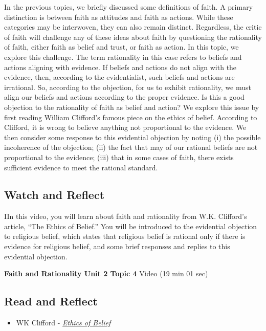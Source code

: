\documentclass[
]{book}
\providecommand{\tightlist}{%
  \setlength{\itemsep}{0pt}\setlength{\parskip}{0pt}}
\begin{document}
In the previous topics, we briefly discussed some definitions of faith. A primary distinction is between faith as attitudes and faith as actions. While these categories may be interwoven, they can also remain distinct. Regardless, the critic of faith will challenge any of these ideas about faith by questioning the rationality of faith, either faith as belief and trust, or faith as action. In this topic, we explore this challenge. The term rationality in this case refers to beliefs and actions aligning with evidence. If beliefs and actions do not align with the evidence, then, according to the evidentialist, such beliefs and actions are irrational. So, according to the objection, for us to exhibit rationality, we must align our beliefs and actions according to the proper evidence. Is this a good objection to the rationality of faith as belief and action? We explore this issue by first reading William Clifford's famous piece on the ethics of belief. According to Clifford, it is wrong to believe anything not proportional to the evidence. We then consider some response to this evidential objection by noting (i) the possible incoherence of the objection; (ii) the fact that may of our rational beliefs are not proportional to the evidence; (iii) that in some cases of faith, there exists sufficient evidence to meet the rational standard.

\hypertarget{watch-and-reflect-15}{%
\subsection*{Watch and Reflect}\label{watch-and-reflect-15}}

IIn this video, you will learn about faith and rationality from W.K. Clifford's article, ``The Ethics of Belief.'' You will be introduced to the evidential objection to religious belief, which states that religious belief is rational only if there is evidence for religious belief, and some brief responses and replies to this evidential objection.

\textbf{Faith and Rationality Unit 2 Topic 4} Video (19 min 01 sec)

\hypertarget{read-and-reflect-6}{%
\subsection*{Read and Reflect}\label{read-and-reflect-6}}

\begin{itemize}
\tightlist
\item
  WK Clifford - \href{assets/u2/PHIL-100-Clifford-Ethics-of-Belief.pdf}{\emph{Ethics of Belief}}
\end{itemize}
\end{document}
